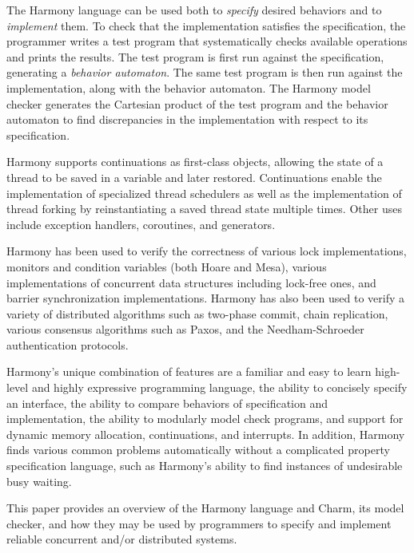 \documentclass[twocolumn]{article}
\begin{document}
The Harmony language can be used both to \emph{specify} desired
behaviors and to \emph{implement} them.  To check that the implementation
satisfies the specification, the programmer writes a test program that
systematically checks available operations and prints the results.
The test program is first run against the specification, generating
a \emph{behavior automaton}.  The same test program is then run
against the implementation, along with the behavior automaton.
The Harmony model checker generates the Cartesian product of the test program
and the behavior automaton to find discrepancies in the implementation
with respect to its specification.

Harmony supports continuations as first-class objects, allowing the
state of a thread to be saved in a variable and later restored.
Continuations enable the implementation of specialized thread
schedulers as well as the implementation of thread forking by
reinstantiating a saved thread state multiple times.
Other uses include exception handlers, coroutines, and generators.

Harmony has been used to verify the correctness of various lock
implementations, monitors and condition variables (both Hoare and Mesa),
various implementations of concurrent data structures including lock-free
ones, and barrier synchronization implementations.  Harmony has also been
used to verify a variety of distributed algorithms such as two-phase
commit, chain replication, various consensus algorithms such as Paxos,
and the Needham-Schroeder authentication protocols.

Harmony's unique combination of features are a familiar and easy
to learn high-level and highly expressive programming language, the
ability to concisely specify an interface, the ability to compare
behaviors of specification and implementation, the ability to
modularly model check programs, and support for dynamic memory
allocation, continuations, and interrupts.  In addition, Harmony
finds various common problems automatically without a complicated
property specification language, such as Harmony's ability to find
instances of undesirable busy waiting.

This paper provides an overview of the Harmony language and Charm,
its model checker, and how they may be used by programmers to
specify and implement reliable concurrent and/or distributed systems.
\end{document}
